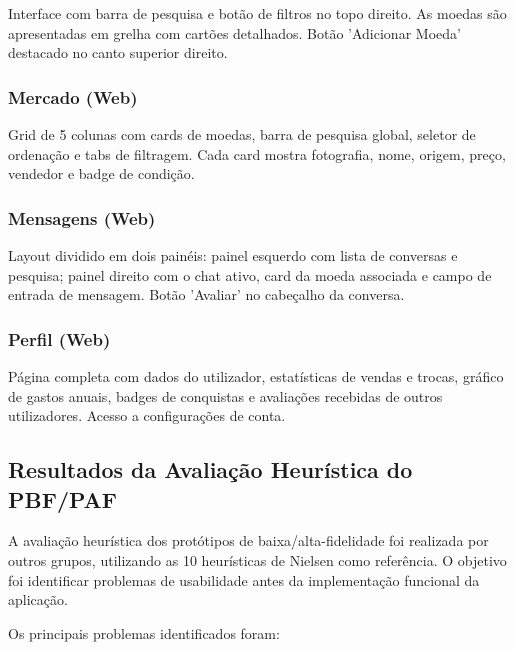 \documentclass[12pt,a4paper]{article}
\begin{document}
Interface com barra de pesquisa e botão de filtros no topo direito. As moedas são apresentadas em grelha com cartões detalhados. Botão 'Adicionar Moeda' destacado no canto superior direito.

\subsubsection{Mercado (Web)}

Grid de 5 colunas com cards de moedas, barra de pesquisa global, seletor de ordenação e tabs de filtragem. Cada card mostra fotografia, nome, origem, preço, vendedor e badge de condição.

\subsubsection{Mensagens (Web)}

Layout dividido em dois painéis: painel esquerdo com lista de conversas e pesquisa; painel direito com o chat ativo, card da moeda associada e campo de entrada de mensagem. Botão 'Avaliar' no cabeçalho da conversa.

\subsubsection{Perfil (Web)}

Página completa com dados do utilizador, estatísticas de vendas e trocas, gráfico de gastos anuais, badges de conquistas e avaliações recebidas de outros utilizadores. Acesso a configurações de conta.

\subsection{Resultados da Avaliação Heurística do PBF/PAF}

A avaliação heurística dos protótipos de baixa/alta-fidelidade foi realizada por outros grupos, utilizando as 10 heurísticas de Nielsen como referência. O objetivo foi identificar problemas de usabilidade antes da implementação funcional da aplicação.

Os principais problemas identificados foram:
\end{document}
